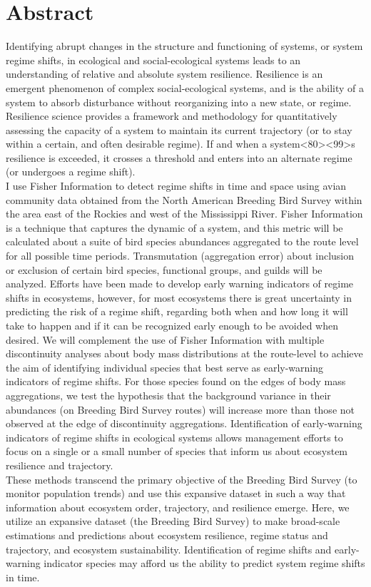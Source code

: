\documentclass[12pt,twoside,openany]{reedthesis}
\begin{document}
\hypertarget{abstract}{%
\chapter*{Abstract}\label{abstract}}

Identifying abrupt changes in the structure and functioning of systems, or system regime shifts, in ecological and social-ecological systems leads to an understanding of relative and absolute system resilience. Resilience is an emergent phenomenon of complex social-ecological systems, and is the ability of a system to absorb disturbance without reorganizing into a new state, or regime. Resilience science provides a framework and methodology for quantitatively assessing the capacity of a system to maintain its current trajectory (or to stay within a certain, and often desirable regime). If and when a system\textless80\textgreater\textless99\textgreater s resilience is exceeded, it crosses a threshold and enters into an alternate regime (or undergoes a regime shift).\\
I use Fisher Information to detect regime shifts in time and space using avian community data obtained from the North American Breeding Bird Survey within the area east of the Rockies and west of the Mississippi River. Fisher Information is a technique that captures the dynamic of a system, and this metric will be calculated about a suite of bird species abundances aggregated to the route level for all possible time periods. Transmutation (aggregation error) about inclusion or exclusion of certain bird species, functional groups, and guilds will be analyzed. Efforts have been made to develop early warning indicators of regime shifts in ecosystems, however, for most ecosystems there is great uncertainty in predicting the risk of a regime shift, regarding both when and how long it will take to happen and if it can be recognized early enough to be avoided when desired. We will complement the use of Fisher Information with multiple discontinuity analyses about body mass distributions at the route-level to achieve the aim of identifying individual species that best serve as early-warning indicators of regime shifts. For those species found on the edges of body mass aggregations, we test the hypothesis that the background variance in their abundances (on Breeding Bird Survey routes) will increase more than those not observed at the edge of discontinuity aggregations. Identification of early-warning indicators of regime shifts in ecological systems allows management efforts to focus on a single or a small number of species that inform us about ecosystem resilience and trajectory.\\
These methods transcend the primary objective of the Breeding Bird Survey (to monitor population trends) and use this expansive dataset in such a way that information about ecosystem order, trajectory, and resilience emerge. Here, we utilize an expansive dataset (the Breeding Bird Survey) to make broad-scale estimations and predictions about ecosystem resilience, regime status and trajectory, and ecosystem sustainability. Identification of regime shifts and early-warning indicator species may afford us the ability to predict system regime shifts in time.
\end{document}
